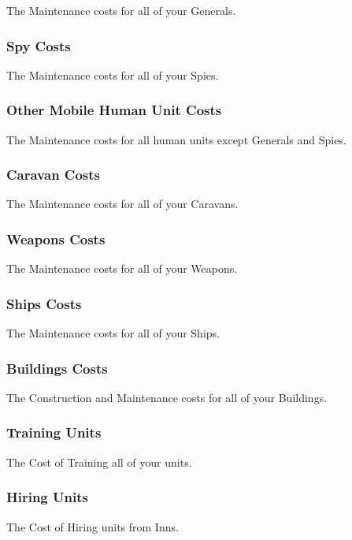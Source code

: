 The Maintenance costs for all of your Generals.

\subsubsection{Spy Costs}

The Maintenance costs for all of your Spies.

\subsubsection{Other Mobile Human Unit Costs}

The Maintenance costs for all human units except Generals and Spies.

\subsubsection{Caravan Costs}

The Maintenance costs for all of your Caravans.

\subsubsection{Weapons Costs}

The Maintenance costs for all of your Weapons.

\subsubsection{Ships Costs}

The Maintenance costs for all of your Ships.

\subsubsection{Buildings Costs}

The Construction and Maintenance costs for all of your Buildings.

\subsubsection{Training Units}

The Cost of Training all of your units.

\subsubsection{Hiring Units}

The Cost of Hiring units from Inns.

